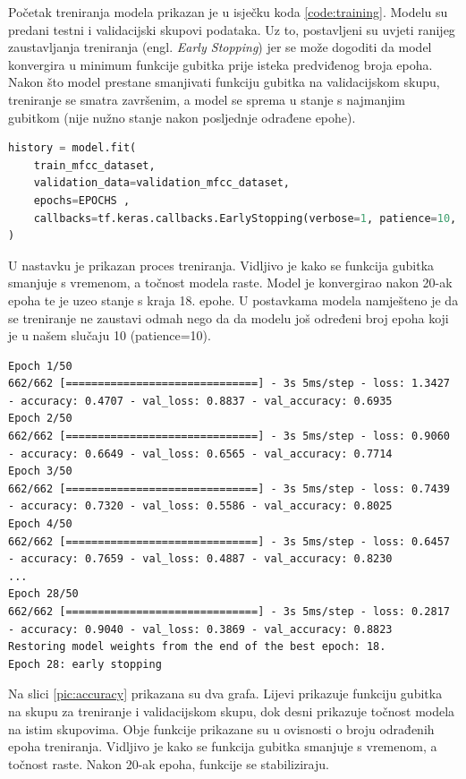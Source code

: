 Početak treniranja modela prikazan je u isječku koda \ref{code:training}. Modelu
su predani testni i validacijski skupovi podataka. Uz to, postavljeni su uvjeti ranijeg
zaustavljanja treniranja (engl. \textit{Early Stopping}) jer se može dogoditi da model
konvergira u minimum funkcije gubitka prije isteka predviđenog broja epoha. Nakon
što model prestane smanjivati funkciju gubitka na validacijskom skupu, treniranje
se smatra završenim, a model se sprema u stanje s najmanjim gubitkom (nije nužno 
stanje nakon posljednje odrađene epohe).

\begin{lstlisting}[language=Python, caption=Trening, label=code:training]
history = model.fit(
    train_mfcc_dataset,
    validation_data=validation_mfcc_dataset,
    epochs=EPOCHS ,
    callbacks=tf.keras.callbacks.EarlyStopping(verbose=1, patience=10, restore_best_weights=True),
)
\end{lstlisting}

U nastavku je prikazan proces treniranja. Vidljivo je kako se funkcija
gubitka smanjuje s vremenom, a točnost modela raste. Model je konvergirao nakon 20-ak
epoha te je uzeo stanje s kraja 18. epohe. U postavkama modela namješteno je da se
treniranje ne zaustavi odmah nego da da modelu još određeni broj epoha koji je
u našem slučaju 10 (patience=10).

{
\tiny
\begin{verbatim}
Epoch 1/50
662/662 [==============================] - 3s 5ms/step - loss: 1.3427 - accuracy: 0.4707 - val_loss: 0.8837 - val_accuracy: 0.6935
Epoch 2/50
662/662 [==============================] - 3s 5ms/step - loss: 0.9060 - accuracy: 0.6649 - val_loss: 0.6565 - val_accuracy: 0.7714
Epoch 3/50
662/662 [==============================] - 3s 5ms/step - loss: 0.7439 - accuracy: 0.7320 - val_loss: 0.5586 - val_accuracy: 0.8025
Epoch 4/50
662/662 [==============================] - 3s 5ms/step - loss: 0.6457 - accuracy: 0.7659 - val_loss: 0.4887 - val_accuracy: 0.8230
...
Epoch 28/50
662/662 [==============================] - 3s 5ms/step - loss: 0.2817 - accuracy: 0.9040 - val_loss: 0.3869 - val_accuracy: 0.8823
Restoring model weights from the end of the best epoch: 18.
Epoch 28: early stopping
\end{verbatim}
}

Na slici \ref{pic:accuracy} prikazana su dva grafa. Lijevi prikazuje funkciju gubitka
na skupu za treniranje i validacijskom skupu, dok desni prikazuje točnost modela na istim skupovima.
Obje funkcije prikazane su u ovisnosti o broju odrađenih epoha treniranja. Vidljivo je
kako se funkcija gubitka smanjuje s vremenom, a točnost raste. Nakon 20-ak epoha, funkcije
se stabiliziraju. 

